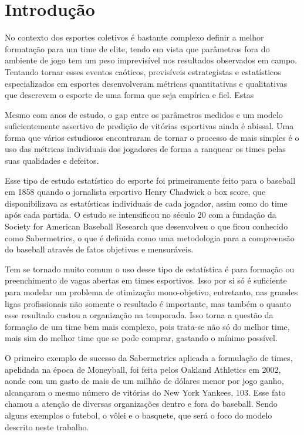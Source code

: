 \section{Introdução}
No contexto dos esportes coletivos é bastante complexo definir  
a melhor formatação para um time de elite, tendo em vista  
que parâmetros fora do ambiente de jogo tem um peso imprevisível nos resultados  
observados em campo. Tentando tornar esses eventos caóticos, previsíveis estrategistas e estatísticos  
especializados em esportes desenvolveram métricas quantitativas e qualitativas que descrevem o esporte  
de uma forma que seja empírica e fiel. Estas  

Mesmo com anos de estudo, o gap entre os parâmetros medidos e um modelo suficientemente assertivo de predição 
de vitórias esportivas ainda é abissal. Uma forma que vários estudiosos encontraram de tornar o processo de mais  
simples é o uso das métricas individuais dos jogadores de forma a ranquear os times pelas suas qualidades e defeitos. 

Esse tipo de estudo estatístico do esporte foi primeiramente feito para o baseball em 1858 quando o jornalista esportivo Henry Chadwick o box score, 
que disponibilizava as estatísticas individuais de cada jogador, assim como do time após cada partida. O estudo se intensificou no século 20  
com a fundação da Society for American Baseball Research que desenvolveu o que ficou conhecido como Sabermetrics, o que é definida como uma metodologia  
para a compreensão do baseball através de fatos objetivos e mensuráveis. 

Tem se tornado muito comum o uso desse tipo de estatística é para formação ou preenchimento de vagas abertas em times esportivos.  
Isso por si só é suficiente para modelar um problema de otimização mono-objetivo, entretanto, nas grandes ligas profissionais  
não somente o resultado é importante, mas também o quanto esse resultado custou a organização na temporada. Isso torna a questão da formação de um time  
bem mais complexo, pois trata-se não só do melhor time, mais sim do melhor time que se pode comprar, gastando o mínimo possível.  

O primeiro exemplo de sucesso da Sabermetrics aplicada a formulação de times, apelidada na época de Moneyball, foi feita pelos Oakland Athletics em 2002, aonde  
com um gasto de mais de um milhão de dólares menor por jogo ganho, alcançaram o mesmo número de vitórias do New York Yankees, 103. Esse fato chamou a atenção de diversas organizações dentro e fora do baseball. 
Sendo alguns exemplos o futebol, o vôlei e o basquete, que será o foco do modelo descrito neste trabalho. 

